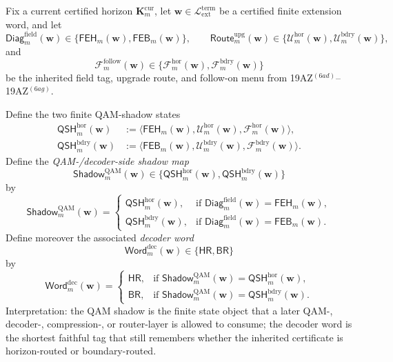 \begin{definition}
\label{def:qam-decoder-side-shadow-state}
Fix a current certified horizon \(\mathbf K_m^{\mathrm{cur}}\), let \(\mathbf w\in \mathcal L_{\mathrm{ext}}^{\mathrm{term}}\) be a certified finite extension word, and let
\[
  \mathsf{Diag}^{\mathrm{field}}_{m}(\mathbf w)
  \in
  \{\mathsf{FEH}_{m}(\mathbf w),\mathsf{FEB}_{m}(\mathbf w)\},
  \qquad
  \mathsf{Route}^{\mathrm{upg}}_{m}(\mathbf w)
  \in
  \{\mathcal U^{\mathrm{hor}}_{m}(\mathbf w),\mathcal U^{\mathrm{bdry}}_{m}(\mathbf w)\},
\]
and
\[
  \mathcal F^{\mathrm{follow}}_{m}(\mathbf w)
  \in
  \{\mathcal F^{\mathrm{hor}}_{m}(\mathbf w),\mathcal F^{\mathrm{bdry}}_{m}(\mathbf w)\}
\]
be the inherited field tag, upgrade route, and follow-on menu from 19AZ$^{(6ad)}$--19AZ$^{(6ag)}$.

Define the two finite QAM-shadow states
\begin{align*}
  \mathsf{QSH}^{\mathrm{hor}}_{m}(\mathbf w)
  &:=
  \bigl\langle
    \mathsf{FEH}_{m}(\mathbf w),
    \mathcal U^{\mathrm{hor}}_{m}(\mathbf w),
    \mathcal F^{\mathrm{hor}}_{m}(\mathbf w)
  \bigr\rangle,\\
  \mathsf{QSH}^{\mathrm{bdry}}_{m}(\mathbf w)
  &:=
  \bigl\langle
    \mathsf{FEB}_{m}(\mathbf w),
    \mathcal U^{\mathrm{bdry}}_{m}(\mathbf w),
    \mathcal F^{\mathrm{bdry}}_{m}(\mathbf w)
  \bigr\rangle.
\end{align*}
Define the \emph{QAM-/decoder-side shadow map}
\[
  \mathsf{Shadow}^{\mathrm{QAM}}_{m}(\mathbf w)
  \in
  \{\mathsf{QSH}^{\mathrm{hor}}_{m}(\mathbf w),\mathsf{QSH}^{\mathrm{bdry}}_{m}(\mathbf w)\}
\]
by
\[
  \mathsf{Shadow}^{\mathrm{QAM}}_{m}(\mathbf w)
  =
  \begin{cases}
    \mathsf{QSH}^{\mathrm{hor}}_{m}(\mathbf w), & \text{if }\mathsf{Diag}^{\mathrm{field}}_{m}(\mathbf w)=\mathsf{FEH}_{m}(\mathbf w),\\[2mm]
    \mathsf{QSH}^{\mathrm{bdry}}_{m}(\mathbf w), & \text{if }\mathsf{Diag}^{\mathrm{field}}_{m}(\mathbf w)=\mathsf{FEB}_{m}(\mathbf w).
  \end{cases}
\]
Define moreover the associated \emph{decoder word}
\[
  \mathsf{Word}^{\mathrm{dec}}_{m}(\mathbf w)
  \in
  \{\mathsf{HR},\mathsf{BR}\}
\]
by
\[
  \mathsf{Word}^{\mathrm{dec}}_{m}(\mathbf w)
  =
  \begin{cases}
    \mathsf{HR}, & \text{if }\mathsf{Shadow}^{\mathrm{QAM}}_{m}(\mathbf w)=\mathsf{QSH}^{\mathrm{hor}}_{m}(\mathbf w),\\[2mm]
    \mathsf{BR}, & \text{if }\mathsf{Shadow}^{\mathrm{QAM}}_{m}(\mathbf w)=\mathsf{QSH}^{\mathrm{bdry}}_{m}(\mathbf w).
  \end{cases}
\]
Interpretation: the QAM shadow is the finite state object that a later QAM-, decoder-, compression-, or router-layer is allowed to consume; the decoder word is the shortest faithful tag that still remembers whether the inherited certificate is horizon-routed or boundary-routed.
\end{definition}

